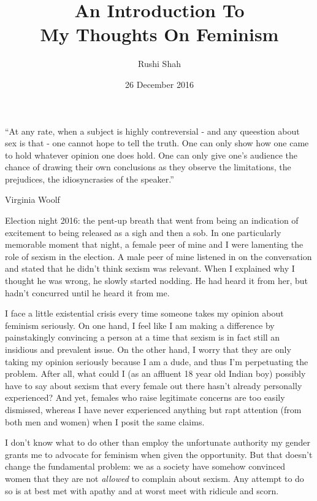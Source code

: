 \documentclass{article}
\author{Rushi Shah}
\date{26 December 2016}
\title{An Introduction To \\ My Thoughts On Feminism}
\begin{document}
\maketitle

	\epigraph{``At any rate, when a subject is highly contreversial - and any queestion about sex is that - one cannot hope to tell the truth. One can only show how one came to hold whatever opinion one does hold. One can only give one's audience the chance of drawing their own conclusions as they observe the limitations, the prejudices, the idiosyncrasies of the speaker.''}{Virginia Woolf}


	Election night 2016: the pent-up breath that went from being an indication of excitement to being released as a sigh and then a sob. In one particularly memorable moment that night, a female peer of mine and I were lamenting the role of sexism in the election. A male peer of mine listened in on the conversation and stated that he didn't think sexism was relevant. When I explained why I thought he was wrong, he slowly started nodding. He had heard it from her, but hadn't concurred until he heard it from me. 

	I face a little existential crisis every time someone takes my opinion about feminism seriously. On one hand, I feel like I am making a difference by painstakingly convincing a person at a time that sexism is in fact still an insidious and prevalent issue. On the other hand, I worry that they are only taking my opinion seriously because I am a dude, and thus I'm perpetuating the problem. After all, what could I (as an affluent 18 year old Indian boy) possibly have to say about sexism that every female out there hasn't already personally experienced? And yet, females who raise legitimate concerns are too easily dismissed, whereas I have never experienced anything but rapt attention (from both men and women) when I posit the same claims.

	I don't know what to do other than employ the unfortunate authority my gender grants me to advocate for feminism when given the opportunity. But that doesn't change the fundamental problem: we as a society have somehow convinced women that they are not \textit{allowed} to complain about sexism. Any attempt to do so is at best met with apathy and at worst meet with ridicule and scorn.
\end{document}
